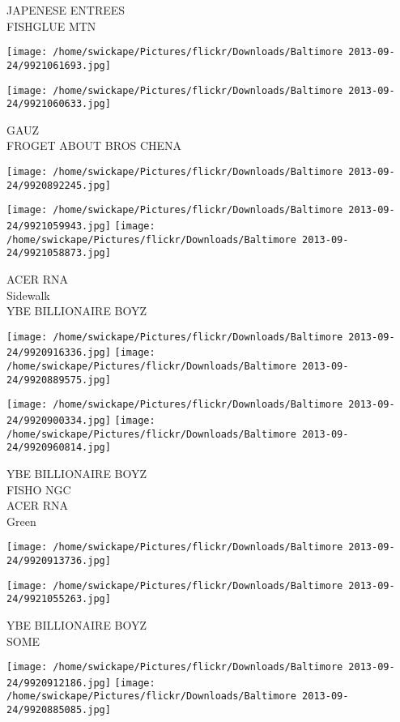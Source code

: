 \documentclass[10pt,letterpaper]{article}
\begin{document}
JAPENESE ENTREES\\
FISHGLUE MTN
\pagebreak

\texttt{[image: /home/swickape/Pictures/flickr/Downloads/Baltimore 2013-09-24/9921061693.jpg]}

\vspace{0.25in}
\texttt{[image: /home/swickape/Pictures/flickr/Downloads/Baltimore 2013-09-24/9921060633.jpg]}

GAUZ\\
FROGET ABOUT BROS CHENA
\pagebreak

\texttt{[image: /home/swickape/Pictures/flickr/Downloads/Baltimore 2013-09-24/9920892245.jpg]}

\vspace{0.25in}
\texttt{[image: /home/swickape/Pictures/flickr/Downloads/Baltimore 2013-09-24/9921059943.jpg]}
\texttt{[image: /home/swickape/Pictures/flickr/Downloads/Baltimore 2013-09-24/9921058873.jpg]}

ACER RNA\\
Sidewalk\\
YBE BILLIONAIRE BOYZ
\pagebreak

\texttt{[image: /home/swickape/Pictures/flickr/Downloads/Baltimore 2013-09-24/9920916336.jpg]}
\texttt{[image: /home/swickape/Pictures/flickr/Downloads/Baltimore 2013-09-24/9920889575.jpg]}

\texttt{[image: /home/swickape/Pictures/flickr/Downloads/Baltimore 2013-09-24/9920900334.jpg]}
\texttt{[image: /home/swickape/Pictures/flickr/Downloads/Baltimore 2013-09-24/9920960814.jpg]}

YBE BILLIONAIRE BOYZ\\
FISHO NGC\\
ACER RNA\\
Green
\pagebreak

\texttt{[image: /home/swickape/Pictures/flickr/Downloads/Baltimore 2013-09-24/9920913736.jpg]}

\vspace{0.25in}
\texttt{[image: /home/swickape/Pictures/flickr/Downloads/Baltimore 2013-09-24/9921055263.jpg]}

YBE BILLIONAIRE BOYZ\\
SOME
\pagebreak

\texttt{[image: /home/swickape/Pictures/flickr/Downloads/Baltimore 2013-09-24/9920912186.jpg]}
\texttt{[image: /home/swickape/Pictures/flickr/Downloads/Baltimore 2013-09-24/9920885085.jpg]}
\end{document}
